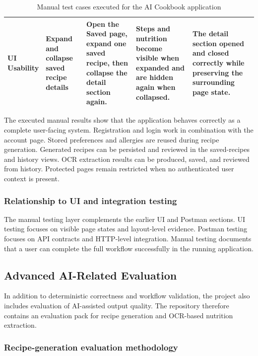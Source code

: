 \begin{table}[H]
\begin{tabularx}{\textwidth}{|p{2.2cm}|p{2.0cm}|>{\raggedright\arraybackslash}X|>{\raggedright\arraybackslash}X|>{\raggedright\arraybackslash}X|}
		\hline
		\makecell[tl]{UI\\Usability} & Expand and collapse saved recipe details & Open the Saved page, expand one saved recipe, then collapse the detail section again. & Steps and nutrition become visible when expanded and are hidden again when collapsed. & The detail section opened and closed correctly while preserving the surrounding page state. \\
		\hline
		\end{tabularx}
	\caption{Manual test cases executed for the AI Cookbook application}
	\label{tab:manual-cases-summary}
\end{table}

The executed manual results show that the application behaves correctly
as a complete user-facing system. Registration and login work in
combination with the account page. Stored preferences and allergies are
reused during recipe generation. Generated recipes can be persisted and
reviewed in the saved-recipes and history views. OCR extraction results
can be produced, saved, and reviewed from history. Protected pages
remain restricted when no authenticated user context is present.

\subsubsection{Relationship to UI and integration testing}

The manual testing layer complements the earlier UI and Postman
sections. UI testing focuses on visible page states and layout-level
evidence. Postman testing focuses on API contracts and HTTP-level
integration. Manual testing documents that a user can complete the full
workflow successfully in the running application.

\subsection{Advanced AI-Related Evaluation}

In addition to deterministic correctness and workflow validation, the
project also includes evaluation of AI-assisted output quality. The
repository therefore contains an evaluation pack for recipe generation
and OCR-based nutrition extraction.

\subsubsection{Recipe-generation evaluation methodology}

